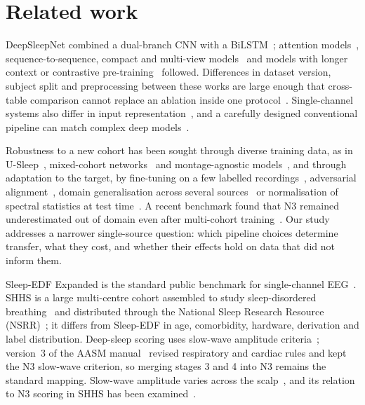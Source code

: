 \documentclass[11pt,a4paper]{article}
\begin{document}
\section{Related work}

DeepSleepNet combined a dual-branch CNN with a BiLSTM~\cite{supratak2017deepsleepnet}; attention
models~\cite{eldele2021attnsleep,phan2022sleeptransformer}, sequence-to-sequence, compact and
multi-view models~\cite{phan2019seqsleepnet,supratak2020tinysleepnet,phan2022xsleepnet} and models
with longer context or contrastive pre-training~\cite{phan2023lseqsleepnet,lee2024sleepyco} followed.
Differences in dataset version, subject split and preprocessing between these works are large enough
that cross-table comparison cannot replace an ablation inside one protocol~\cite{phan2022review}.
Single-channel systems also differ in input representation~\cite{haghayegh2023sleepinceptionnet},
and a carefully designed conventional pipeline can match complex deep models~\cite{vdd2023traditional}.

Robustness to a new cohort has been sought through diverse training data, as in
U-Sleep~\cite{perslev2021usleep,fiorillo2023usleep}, mixed-cohort networks~\cite{olesen2021mixed} and
montage-agnostic models~\cite{guillot2021robustsleepnet}, and through adaptation to the target, by
fine-tuning on a few labelled recordings~\cite{phan2021transfer}, adversarial
alignment~\cite{heremans2022adversarial,eldele2023adast}, domain generalisation across several
sources~\cite{wang2024sleepdg} or normalisation of spectral statistics at test
time~\cite{gnassounou2025psdnorm}. A recent benchmark found that N3 remained underestimated out of
domain even after multi-cohort training~\cite{deirossi2025sleepyland}. Our study addresses a narrower
single-source question: which pipeline choices determine transfer, what they cost, and whether their
effects hold on data that did not inform them.

Sleep-EDF Expanded is the standard public benchmark for single-channel
EEG~\cite{kemp2000sleepEDF,physionetSleepEDF,pollard2026physionet}. SHHS is a large multi-centre
cohort assembled to study sleep-disordered breathing~\cite{quan1997shhs} and distributed through the
National Sleep Research Resource (NSRR)~\cite{zhang2018nsrr}; it differs from Sleep-EDF in age,
comorbidity, hardware, derivation and label distribution. Deep-sleep scoring uses slow-wave amplitude
criteria~\cite{rechtschaffen1968,berry2017aasm}; version~3 of the AASM manual~\cite{troester2023aasm}
revised respiratory and cardiac rules and kept the N3 slow-wave criterion, so merging stages 3 and 4 into N3
remains the standard mapping. Slow-wave amplitude varies across the
scalp~\cite{massimini2004travelling}, and its relation to N3 scoring in SHHS has been
examined~\cite{davidson2025n3}.
\end{document}
